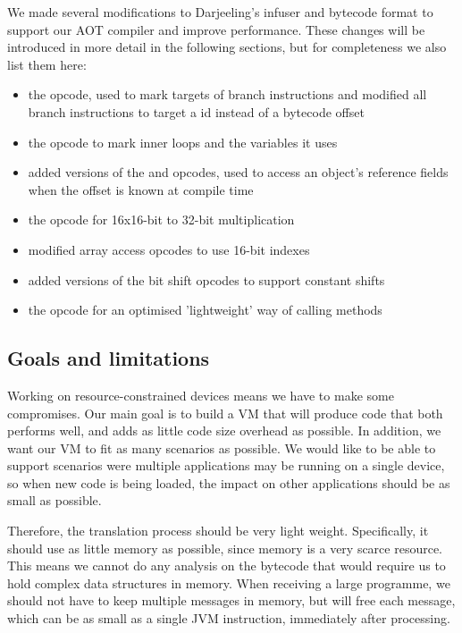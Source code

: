 We made several modifications to Darjeeling's infuser and bytecode format to support our AOT compiler and improve performance. These changes will be introduced in more detail in the following sections, but for completeness we also list them here:

\begin{itemize}
	\item the  opcode, used to mark targets of branch instructions and modified all branch instructions to target a  id instead of a bytecode offset
	\item the  opcode to mark inner loops and the variables it uses
	\item added  versions of the  and  opcodes, used to access an object's reference fields when the offset is known at compile time
	\item the  opcode for 16x16-bit to 32-bit multiplication
	\item modified array access opcodes to use 16-bit indexes
	\item added  versions of the bit shift opcodes to support constant shifts
	\item the  opcode for an optimised 'lightweight' way of calling methods
\end{itemize}

\subsection{Goals and limitations}
Working on resource-constrained devices means we have to make some compromises. Our main goal is to build a VM that will produce code that both performs well, and adds as little code size overhead as possible. In addition, we want our VM to fit as many scenarios as possible. We would like to be able to support scenarios were multiple applications may be running on a single device, so when new code is being loaded, the impact on other applications should be as small as possible.

Therefore, the translation process should be very light weight. Specifically, it	 should use as little memory as possible, since memory is a very scarce resource. This means we cannot do any analysis on the bytecode that would require us to hold complex data structures in memory. When receiving a large programme, we should not have to keep multiple messages in memory, but will free each message, which can be as small as a single JVM instruction, immediately after processing.

